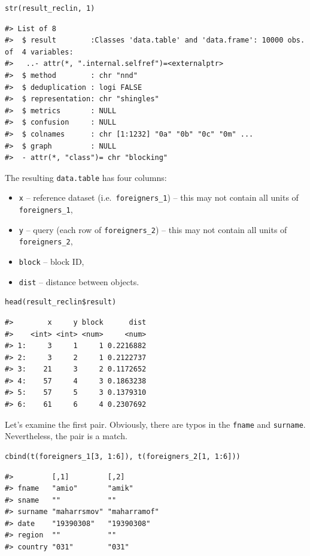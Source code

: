 \begin{verbatim}
str(result_reclin, 1)
\end{verbatim}

\begin{verbatim}
#> List of 8
#>  $ result        :Classes 'data.table' and 'data.frame': 10000 obs. of  4 variables:
#>   ..- attr(*, ".internal.selfref")=<externalptr> 
#>  $ method        : chr "nnd"
#>  $ deduplication : logi FALSE
#>  $ representation: chr "shingles"
#>  $ metrics       : NULL
#>  $ confusion     : NULL
#>  $ colnames      : chr [1:1232] "0a" "0b" "0c" "0m" ...
#>  $ graph         : NULL
#>  - attr(*, "class")= chr "blocking"
\end{verbatim}

The resulting \texttt{data.table} has four columns:

\begin{itemize}
\tightlist
\item
  \texttt{x} -- reference dataset (i.e.~\texttt{foreigners\_1}) -- this may not contain all units of \texttt{foreigners\_1},
\item
  \texttt{y} -- query (each row of \texttt{foreigners\_2}) -- this may not contain all units of \texttt{foreigners\_2},
\item
  \texttt{block} -- block ID,
\item
  \texttt{dist} -- distance between objects.
\end{itemize}

\begin{verbatim}
head(result_reclin$result)
\end{verbatim}

\begin{verbatim}
#>        x     y block      dist
#>    <int> <int> <num>     <num>
#> 1:     3     1     1 0.2216882
#> 2:     3     2     1 0.2122737
#> 3:    21     3     2 0.1172652
#> 4:    57     4     3 0.1863238
#> 5:    57     5     3 0.1379310
#> 6:    61     6     4 0.2307692
\end{verbatim}

Let's examine the first pair. Obviously, there are typos in the \texttt{fname} and \texttt{surname}. Nevertheless, the pair is a match.

\begin{verbatim}
cbind(t(foreigners_1[3, 1:6]), t(foreigners_2[1, 1:6]))
\end{verbatim}

\begin{verbatim}
#>         [,1]         [,2]        
#> fname   "amio"       "amik"      
#> sname   ""           ""          
#> surname "maharrsmov" "maharramof"
#> date    "19390308"   "19390308"  
#> region  ""           ""          
#> country "031"        "031"
\end{verbatim}

